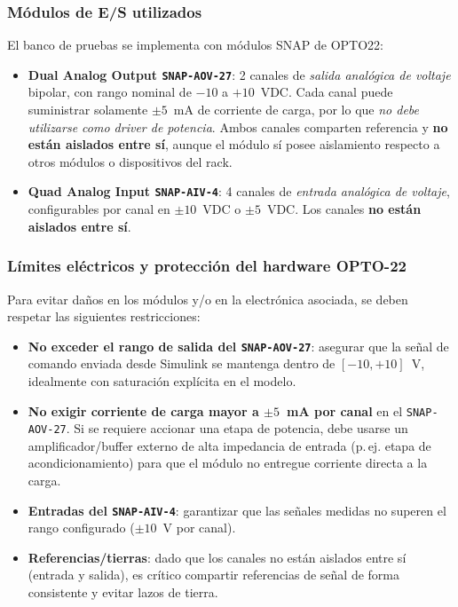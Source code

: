 \subsubsection{Módulos de E/S utilizados}
El banco de pruebas se implementa con módulos SNAP de OPTO22:
\begin{itemize}
    \item \textbf{Dual Analog Output \texttt{SNAP-AOV-27}}: 2 canales de \emph{salida analógica de voltaje} bipolar, con rango nominal de \(-10\) a \(+10\)~VDC. Cada canal puede suministrar solamente \(\pm 5\)~mA de corriente de carga, por lo que \emph{no debe utilizarse como driver de potencia}. Ambos canales comparten referencia y \textbf{no están aislados entre sí}, aunque el módulo sí posee aislamiento respecto a otros módulos o dispositivos del rack. \cite{opto22_snap_aov27}
    \item \textbf{Quad Analog Input \texttt{SNAP-AIV-4}}: 4 canales de \emph{entrada analógica de voltaje}, configurables por canal en \(\pm 10\)~VDC o \(\pm 5\)~VDC. Los canales \textbf{no están aislados entre sí}. \cite{opto22_snap_aiv4}
\end{itemize}

\subsubsection{Límites eléctricos y protección del hardware OPTO-22}
Para evitar daños en los módulos y/o en la electrónica asociada, se deben respetar las siguientes restricciones:
\begin{itemize}
    \item \textbf{No exceder el rango de salida del \texttt{SNAP-AOV-27}}: asegurar que la señal de comando enviada desde Simulink se mantenga dentro de \([-10, +10]\)~V, idealmente con saturación explícita en el modelo.
    \item \textbf{No exigir corriente de carga mayor a \(\pm 5\)~mA por canal} en el \texttt{SNAP-AOV-27}. Si se requiere accionar una etapa de potencia, debe usarse un amplificador/buffer externo de alta impedancia de entrada (p.\,ej. etapa de acondicionamiento) para que el módulo no entregue corriente directa a la carga. 
    \item \textbf{Entradas del \texttt{SNAP-AIV-4}}: garantizar que las señales medidas no superen el rango configurado (\(\pm 10\)~V por canal).
    \item \textbf{Referencias/tierras}: dado que los canales no están aislados entre sí (entrada y salida), es crítico compartir referencias de señal de forma consistente y evitar lazos de tierra.
\end{itemize}

